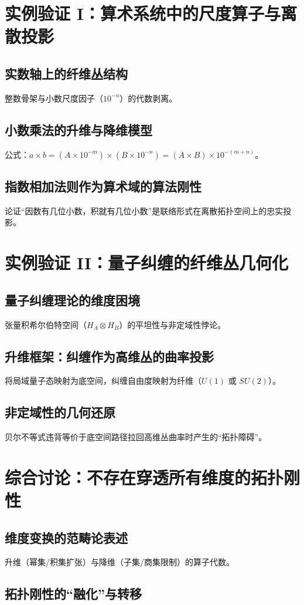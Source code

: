 \documentclass[11pt,a4paper]{article}
\begin{document}
\section{实例验证 I：算术系统中的尺度算子与离散投影}
\subsection{实数轴上的纤维丛结构}
整数骨架与小数尺度因子（\(10^{-n}\)）的代数剥离。
\subsection{小数乘法的升维与降维模型}
公式：\(a\times b=(A\times 10^{-m})\times(B\times 10^{-n})=(A\times B)\times 10^{-(m+n)}\)。
\subsection{指数相加法则作为算术域的算法刚性}
论证“因数有几位小数，积就有几位小数”是联络形式在离散拓扑空间上的忠实投影。

\section{实例验证 II：量子纠缠的纤维丛几何化}
\subsection{量子纠缠理论的维度困境}
张量积希尔伯特空间（\(H_A\otimes H_B\)）的平坦性与非定域性悖论。
\subsection{升维框架：纠缠作为高维丛的曲率投影}
将局域量子态映射为底空间，纠缠自由度映射为纤维（\(U(1)\) 或 \(SU(2)\)）。
\subsection{非定域性的几何还原}
贝尔不等式违背等价于底空间路径拉回高维丛曲率时产生的“拓扑障碍”。

\section{综合讨论：不存在穿透所有维度的拓扑刚性}
\subsection{维度变换的范畴论表述}
升维（幂集/积集扩张）与降维（子集/商集限制）的算子代数。
\subsection{拓扑刚性的“融化”与转移}
\end{document}
